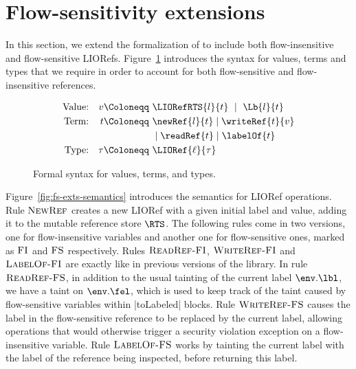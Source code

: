 \section{Flow-sensitivity extensions}

In this section, we extend the formalization of {\LIO} to include both
flow-insensitive and flow-sensitive
LIORefs. Figure~\ref{fig:fs-exts-syntax} introduces the syntax for
values, terms and types that we require in order to account for both
flow-sensitive and flow-insensitive references.

\begin{figure}[!ht] %
\vspace*{-5pt}
\begin{align*}
\textrm{Value:}   && v    \Coloneqq~ &
                                 \LIORefRTS{l}{t}
                           \ \mid\  \Lb{l}{t} \\
\textrm{Term:}    && t    \Coloneqq~ &
                             \newRef{l}{t}
                           \mid  \writeRef{t}{v} \\
                  && &     \mid  \readRef{t}
                           \mid  \labelOf{t} \\
\textrm{Type:}    && \tau \Coloneqq~& 
                          \LIORef{\ell}{\tau} \\
\end{align*}
\caption{Formal syntax for values, terms, and types.\label{fig:fs-exts-syntax}}
\vspace*{-5pt}
\end{figure} 

Figure~\ref{fig:fs-exts-semantics} introduces the semantics for LIORef
operations. Rule $\textsc{NewRef}$ creates a new LIORef with a given
initial label and value, adding it to the mutable reference store
$\RTS$. The following rules come in two versions, one for
flow-insensitive variables and another one for flow-sensitive ones,
marked as $\textsc{FI}$ and $\textsc{FS}$ respectively. Rules
$\textsc{ReadRef-FI}$, $\textsc{WriteRef-FI}$ and
$\textsc{LabelOf-FI}$ are exactly like in previous versions of the
library. In rule $\textsc{ReadRef-FS}$, in addition to the usual
tainting of the current label $\env.\lbl$, we have a taint on
$\env.\fel$, which is used to keep track of the taint caused by
flow-sensitive variables within |toLabeled| blocks. Rule
$\textsc{WriteRef-FS}$ causes the label in the flow-sensitive
reference to be replaced by the current label, allowing operations
that would otherwise trigger a security violation exception on a
flow-insensitive variable. Rule $\textsc{LabelOf-FS}$ works by
tainting the current label with the label of the reference being
inspected, before returning this label.

